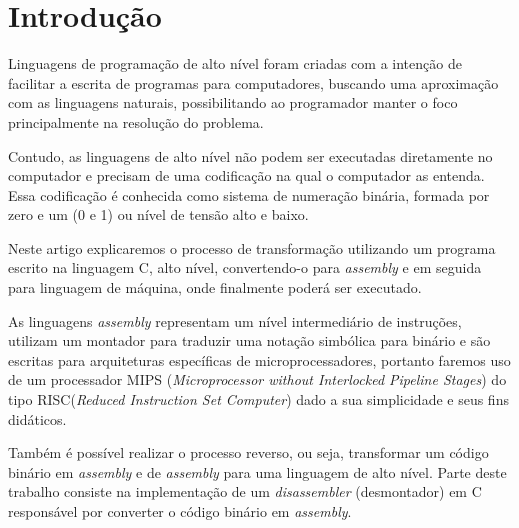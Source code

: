\section{Introdução} \label{sec_introducao}
Linguagens de programação de alto nível foram criadas com a intenção de facilitar a escrita de programas para computadores, buscando uma aproximação com as linguagens naturais, possibilitando ao programador manter o foco principalmente na resolução do problema. 

Contudo, as linguagens de alto nível não podem ser executadas diretamente no computador e precisam de uma codificação na qual o computador as entenda. Essa codificação é conhecida como sistema de numeração binária, formada por zero e um (0 e 1) ou nível de tensão alto e baixo. 

Neste artigo explicaremos o processo de transformação utilizando um programa escrito na linguagem C, alto nível, convertendo-o para \textit{assembly} e em seguida para linguagem de máquina, onde finalmente poderá ser executado.

As linguagens \textit{assembly} representam um nível intermediário de instruções, utilizam um montador para traduzir uma notação simbólica para binário e são escritas para arquiteturas específicas de microprocessadores, portanto faremos uso de um processador MIPS (\textit{Microprocessor without Interlocked Pipeline Stages}) do tipo RISC(\textit{Reduced Instruction Set Computer}) dado a sua simplicidade e seus fins didáticos. 

Também é possível realizar o processo reverso, ou seja, transformar um código binário em \textit{assembly} e de \textit{assembly} para uma linguagem de alto nível. Parte deste trabalho consiste na implementação de um \textit{disassembler} (desmontador) em C responsável por converter o código binário em \textit{assembly}.


